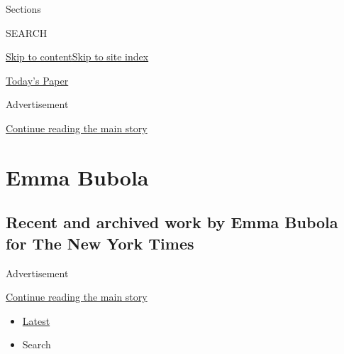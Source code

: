 Sections

SEARCH

\protect\hyperlink{site-content}{Skip to
content}\protect\hyperlink{site-index}{Skip to site index}

\href{https://myaccount.nytimes.com/auth/login?response_type=cookie\&client_id=vi}{}

\href{https://www.nytimes.com/section/todayspaper}{Today's Paper}

Advertisement

\protect\hyperlink{after-top}{Continue reading the main story}

\hypertarget{emma-bubola}{%
\section{Emma Bubola}\label{emma-bubola}}

\hypertarget{recent-and-archived-work-by-emma-bubola-for-the-new-york-times}{%
\subsection{Recent and archived work by Emma Bubola for The New York
Times}\label{recent-and-archived-work-by-emma-bubola-for-the-new-york-times}}

Advertisement

\protect\hyperlink{after-mid1}{Continue reading the main story}

\begin{itemize}
\tightlist
\item
  \protect\hyperlink{stream-panel}{Latest}
\item
  Search
\end{itemize}

